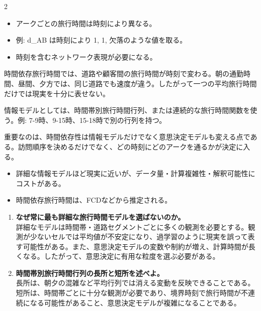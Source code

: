 \clearpage
{}
\begin{multicols}{2}\footnotesize\raggedcolumns
{}
\begin{itemize}
\item アークごとの旅行時間は時刻により異なる。
\item 例: d\_AB は時刻により 1, 1, 欠落のような値を取る。
\item 時刻を含むネットワーク表現が必要になる。
\end{itemize}
時間依存旅行時間では、道路や顧客間の旅行時間が時刻で変わる。朝の通勤時間、昼間、夕方では、同じ道路でも速度が違う。したがって一つの平均旅行時間だけでは現実を十分に表せない。\par

情報モデルとしては、時間帯別旅行時間行列、または連続的な旅行時間関数を使う。例: 7-9時、9-15時、15-18時で別の行列を持つ。\par

重要なのは、時間依存性は情報モデルだけでなく意思決定モデルも変える点である。訪問順序を決めるだけでなく、どの時刻にどのアークを通るかが決定に入る。\par
{}
\begin{itemize}
\item 詳細な情報モデルほど現実に近いが、データ量・計算複雑性・解釈可能性にコストがある。
\item 時間依存旅行時間は、FCDなどから推定される。
\end{itemize}
\begin{enumerate}
\item \textbf{なぜ常に最も詳細な旅行時間モデルを選ばないのか。}\\詳細なモデルは時間帯・道路セグメントごとに多くの観測を必要とする。観測が少ないセルでは平均値が不安定になり、過学習のように現実を誤って表す可能性がある。また、意思決定モデルの変数や制約が増え、計算時間が長くなる。したがって、意思決定に有用な粒度を選ぶ必要がある。
\item \textbf{時間帯別旅行時間行列の長所と短所を述べよ。}\\長所は、朝夕の混雑など平均行列では消える変動を反映できることである。短所は、時間帯ごとに十分な観測が必要であり、境界時刻で旅行時間が不連続になる可能性があること、意思決定モデルが複雑になることである。
\end{enumerate}
\end{multicols}

